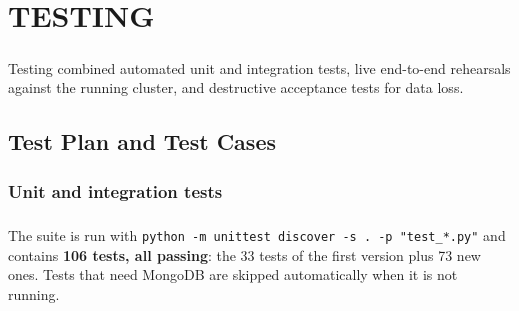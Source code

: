 \chapter{TESTING}

\paragraph{}
Testing combined automated unit and integration tests, live end-to-end rehearsals against the running cluster, and destructive acceptance tests for data loss.

\section{Test Plan and Test Cases}
\subsection{Unit and integration tests}
\paragraph{}
The suite is run with \texttt{python -m unittest discover -s . -p "test\_*.py"} and contains \textbf{106 tests, all passing}: the 33 tests of the first version plus 73 new ones. Tests that need MongoDB are skipped automatically when it is not running.

